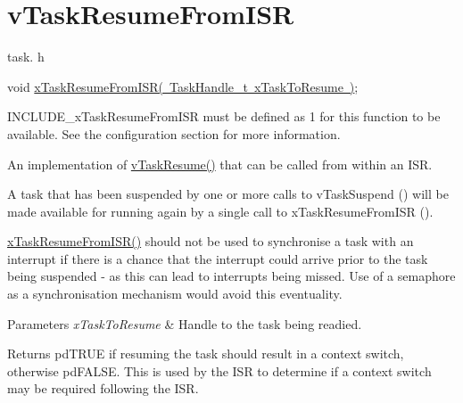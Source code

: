 \hypertarget{group__v_task_resume_from_i_s_r}{}\section{v\+Task\+Resume\+From\+I\+SR}
\label{group__v_task_resume_from_i_s_r}
task. h 
\begin{DoxyPre}void \mbox{\hyperlink{task_8h_aefbfd37c0661c3062fafd7334bff9aed}{xTaskResumeFromISR( TaskHandle\_t xTaskToResume )}};\end{DoxyPre}


I\+N\+C\+L\+U\+D\+E\+\_\+x\+Task\+Resume\+From\+I\+SR must be defined as 1 for this function to be available. See the configuration section for more information.

An implementation of \mbox{\hyperlink{task_8h_a84a1584f29fb7736a1aa72ad5b3e9b44}{v\+Task\+Resume()}} that can be called from within an I\+SR.

A task that has been suspended by one or more calls to v\+Task\+Suspend () will be made available for running again by a single call to x\+Task\+Resume\+From\+I\+SR ().

\mbox{\hyperlink{task_8h_aefbfd37c0661c3062fafd7334bff9aed}{x\+Task\+Resume\+From\+I\+S\+R()}} should not be used to synchronise a task with an interrupt if there is a chance that the interrupt could arrive prior to the task being suspended -\/ as this can lead to interrupts being missed. Use of a semaphore as a synchronisation mechanism would avoid this eventuality.


\begin{DoxyParams}{Parameters}
{\em x\+Task\+To\+Resume} & Handle to the task being readied.\\
\hline
\end{DoxyParams}
\begin{DoxyReturn}{Returns}
pd\+T\+R\+UE if resuming the task should result in a context switch, otherwise pd\+F\+A\+L\+SE. This is used by the I\+SR to determine if a context switch may be required following the I\+SR. 
\end{DoxyReturn}
